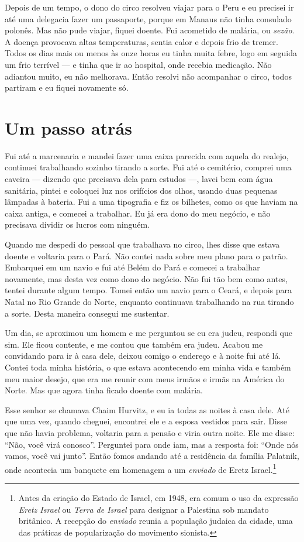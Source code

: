 Depois de um tempo, o dono do circo resolveu viajar para o Peru e eu precisei 
ir até uma delegacia fazer um passaporte, porque em
Manaus não tinha consulado polonês. Mas não pude viajar, fiquei
doente. Fui acometido de malária, ou \textit{sezão}. A doença
provocava altas temperaturas, sentia calor e depois frio de tremer.
Todos os dias mais ou menos às onze horas eu tinha muita febre, logo em
seguida um frio terrível --- e tinha que ir ao hospital, onde recebia
medicação. Não adiantou muito, eu não melhorava. Então resolvi não
acompanhar o circo, todos partiram e eu fiquei novamente só.

\chapter{Um passo atrás}

Fui até a marcenaria e mandei fazer uma caixa parecida com aquela do
realejo, continuei trabalhando sozinho tirando a sorte. Fui até o
cemitério, comprei uma caveira --- dizendo que precisava dela para estudos  ---,
lavei bem com água sanitária, pintei e coloquei luz nos orifícios dos
olhos, usando duas pequenas lâmpadas à bateria. Fui a uma tipografia e
fiz os bilhetes, como os que haviam na caixa antiga, e comecei a trabalhar. Eu
já era dono do meu negócio, e não precisava dividir os lucros com
ninguém.

Quando me despedi do pessoal que trabalhava no circo, lhes disse que
estava doente e voltaria para o Pará. Não contei nada sobre meu plano
para o patrão. Embarquei em um navio e fui até Belém do Pará e comecei a
trabalhar novamente, mas desta vez como dono do negócio. Não fui tão bem 
como antes, tentei durante algum tempo. Tomei então um navio para o 
Ceará, e depois para Natal no Rio Grande do Norte, enquanto continuava
trabalhando na rua tirando a sorte. Desta maneira consegui me
sustentar.

Um dia, se aproximou um homem e me perguntou se eu era judeu, respondi
que sim. Ele ficou contente, e me contou que também era judeu. Acabou me
convidando para ir à casa dele, deixou comigo o endereço e à noite fui até lá.
Contei toda minha história, o que estava acontecendo em minha vida e
também meu maior desejo, que era me reunir com meus irmãos e irmãs na América
do Norte. Mas que agora tinha ficado doente com malária. 

Esse senhor se chamava Chaim Hurvitz, e eu ia todas as noites à casa dele. Até que uma vez, quando cheguei, encontrei ele e a esposa vestidos para sair. Disse que não havia problema, voltaria para a pensão e viria outra noite. Ele me disse: ``Não, você virá conosco''. Perguntei para onde iam, mas a resposta foi: ``Onde nós vamos, você vai junto''. Então fomos andando até a residência da família Palatnik, onde acontecia um banquete em homenagem a um \textit{enviado} de Eretz Israel.\footnote{Antes da criação do Estado de Israel, em 1948, era comum o uso da expressão \textit{Eretz Israel} ou \textit{Terra de Israel} para designar a Palestina sob mandato britânico. A recepção do \textit{enviado} reunia a população judaica da cidade, uma das práticas de popularização do movimento sionista.} 

